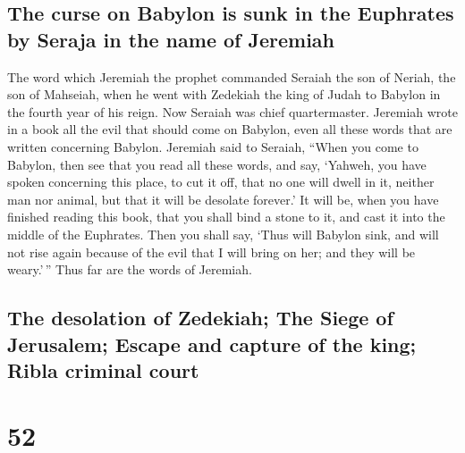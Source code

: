 \hypertarget{the-curse-on-babylon-is-sunk-in-the-euphrates-by-seraja-in-the-name-of-jeremiah}{%
\subsection{The curse on Babylon is sunk in the Euphrates by Seraja in
the name of
Jeremiah}\label{the-curse-on-babylon-is-sunk-in-the-euphrates-by-seraja-in-the-name-of-jeremiah}}

 The word which Jeremiah the prophet commanded Seraiah
the son of Neriah, the son of Mahseiah, when he went with Zedekiah the
king of Judah to Babylon in the fourth year of his reign. Now Seraiah
was chief quartermaster.  Jeremiah wrote in a book all
the evil that should come on Babylon, even all these words that are
written concerning Babylon.  Jeremiah said to Seraiah,
``When you come to Babylon, then see that you read all these words,
 and say, `Yahweh, you have spoken concerning this place,
to cut it off, that no one will dwell in it, neither man nor animal, but
that it will be desolate forever.'  It will be, when you
have finished reading this book, that you shall bind a stone to it, and
cast it into the middle of the Euphrates.  Then you shall
say, `Thus will Babylon sink, and will not rise again because of the
evil that I will bring on her; and they will be weary.'\,'' Thus far are
the words of Jeremiah.

\hypertarget{the-desolation-of-zedekiah-the-siege-of-jerusalem-escape-and-capture-of-the-king-ribla-criminal-court}{%
\subsection{The desolation of Zedekiah; The Siege of Jerusalem; Escape
and capture of the king; Ribla criminal
court}\label{the-desolation-of-zedekiah-the-siege-of-jerusalem-escape-and-capture-of-the-king-ribla-criminal-court}}

\hypertarget{section-51}{%
\section{52}\label{section-51}}

